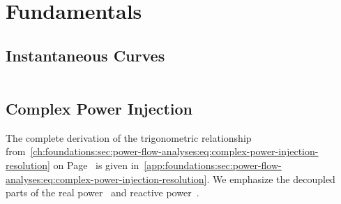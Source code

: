 \chapter{Fundamentals}
\label{ch:appendix:sec:fundamentals}
%
\renewcommand{\theequation}{\thechapter.\arabic{equation}}
%
\section{Instantaneous Curves} 
\label{ch:appendix:sec:fundamentals:sinusoid-plot-derivation}
% 
%
\begin{subequations}
    
    \label{app:foundations:sec:complex-real-reactive-power}
\end{subequations}
% 
\clearpage
% 
\section{Complex Power Injection}
\label{ch:appendix:sec:fundamentals:sec:complex-power-injection}
% 
The complete derivation of the trigonometric relationship
from~\cref{ch:foundations:sec:power-flow-analyses:eq:complex-power-injection-resolution}
on
Page~\pageref{ch:foundations:sec:power-flow-analyses:eq:complex-power-injection-resolution}
is given
in~\cref{app:foundations:sec:power-flow-analyses:eq:complex-power-injection-resolution}.
We emphasize the decoupled parts of the real power~ and
reactive power~.
% 
\begin{subequations}
    
    \label{app:foundations:sec:power-flow-analyses:eq:complex-power-injection-resolution}
\end{subequations}
% 
\clearpage
% 
